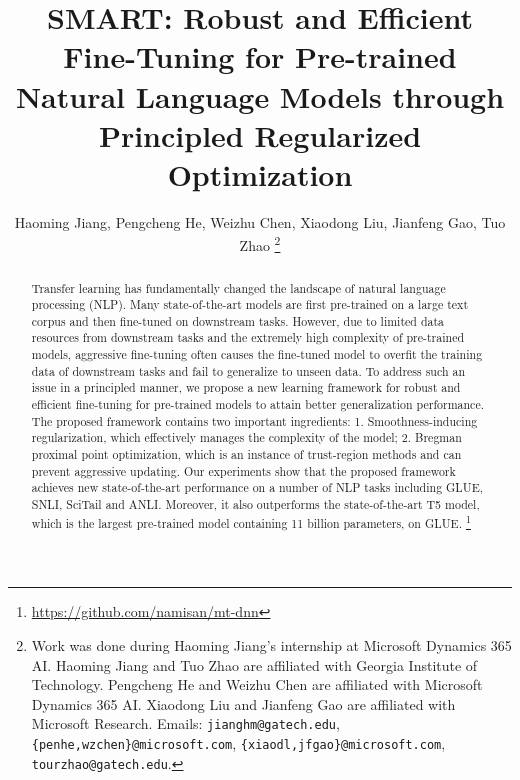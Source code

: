 \documentclass[11pt]{article} \usepackage{url}
\begin{document}
\title{SMART: Robust and Efficient Fine-Tuning for Pre-trained Natural Language Models through Principled Regularized Optimization}

\author{Haoming Jiang, Pengcheng He, Weizhu Chen, Xiaodong Liu, Jianfeng Gao, Tuo Zhao \thanks{Work was done during Haoming Jiang's internship at Microsoft Dynamics 365 AI. Haoming Jiang and Tuo Zhao are affiliated with Georgia Institute of Technology. Pengcheng He and Weizhu Chen are affiliated with Microsoft Dynamics 365 AI. Xiaodong Liu and Jianfeng Gao are affiliated with Microsoft Research. Emails: \texttt{jianghm@gatech.edu}, \texttt{\{penhe,wzchen\}@microsoft.com}, \texttt{\{xiaodl,jfgao\}@microsoft.com}, \texttt{tourzhao@gatech.edu}. }}



\date{}

\maketitle



\begin{abstract}
\vspace{-0.05in}

Transfer learning has fundamentally changed the landscape of natural language processing (NLP). Many state-of-the-art models are first pre-trained on a large text corpus and then fine-tuned on downstream tasks. However, due to limited data resources from downstream tasks and the extremely high complexity of pre-trained models, aggressive fine-tuning often causes the fine-tuned model to overfit the training data of downstream tasks and fail to generalize to unseen data. 
To address such an issue in a principled manner, we propose a new learning framework for robust and efficient fine-tuning for pre-trained models to attain better generalization performance.
The proposed framework contains two important ingredients: 1. Smoothness-inducing regularization, which effectively manages the complexity of the model; 2.  Bregman proximal point optimization, which is an instance of trust-region methods and can prevent aggressive updating. 
Our experiments show that the proposed framework achieves new state-of-the-art performance on a number of NLP tasks including GLUE, SNLI, SciTail and ANLI. Moreover, it also outperforms the state-of-the-art T5 model, which is the largest pre-trained model containing 11 billion parameters, on GLUE.
\footnote{\url{https://github.com/namisan/mt-dnn}}

\end{abstract}
\end{document}
